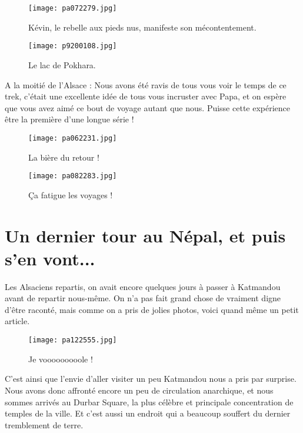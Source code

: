 \documentclass{book}
\begin{document}
\begin{figure}[h]
\centering
\texttt{[image: pa072279.jpg]}
\caption*{Kévin, le rebelle aux pieds nus, manifeste son mécontentement.}
\end{figure}


\begin{figure}[h]
\centering
\texttt{[image: p9200108.jpg]}
\caption*{Le lac de Pokhara.}
\end{figure}

A la moitié de l'Alsace : Nous avons été ravis de tous vous voir le temps de ce trek, c'était une excellente idée de tous vous incruster avec Papa, et on espère que vous avez aimé ce bout de voyage autant que nous. Puisse cette expérience être la première d'une longue série !


\begin{figure}[h]
\centering
\texttt{[image: pa062231.jpg]}
\caption*{La bière du retour !}
\end{figure}


\begin{figure}[h]
\centering
\texttt{[image: pa082283.jpg]}
\caption*{Ça fatigue les voyages !}
\end{figure}



\chapter{Un dernier tour au Népal, et puis s'en vont...}
Les Alsaciens repartis, on avait encore quelques jours à passer à Katmandou avant de repartir nous-même. On n'a pas fait grand chose de vraiment digne d'être raconté, mais comme on a pris de jolies photos, voici quand même un petit article.


\begin{figure}[h]
\centering
\texttt{[image: pa122555.jpg]}
\caption*{Je vooooooooole !}
\end{figure}

C'est ainsi que l'envie d'aller visiter un peu Katmandou nous a pris par surprise. Nous avons donc affronté encore un peu de circulation anarchique, et nous sommes arrivés au Durbar Square, la plus célèbre et principale concentration de temples de la ville. Et c'est aussi un endroit qui a beaucoup souffert du dernier tremblement de terre.
\end{document}
